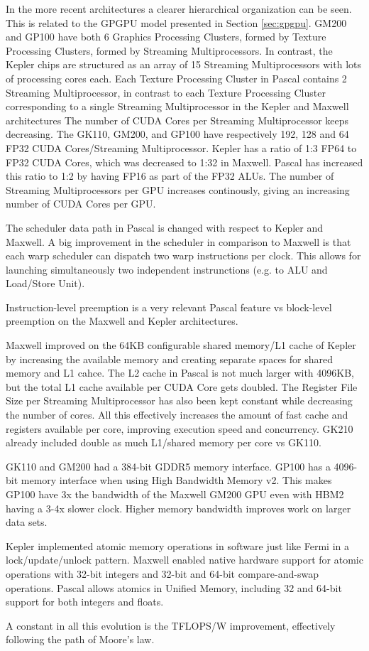 In the more recent architectures a clearer hierarchical organization can be seen.
This is related to the GPGPU model presented in Section \ref{sec:gpgpu}.
GM200 and GP100 have both 6 Graphics Processing Clusters, formed by Texture Processing Clusters, formed by Streaming Multiprocessors.
In contrast, the Kepler chips are structured as an array of 15 Streaming Multiprocessors with lots of processing cores each.
Each Texture Processing Cluster in Pascal contains 2 Streaming Multiprocessor, in contrast to each Texture Processing Cluster corresponding to a single Streaming Multiprocessor in the Kepler and Maxwell architectures
The number of CUDA Cores per Streaming Multiprocessor keeps decreasing.
The GK110, GM200, and GP100 have respectively 192, 128 and 64 FP32 CUDA Cores/Streaming Multiprocessor.
Kepler has a ratio of 1:3 FP64 to FP32 CUDA Cores, which was decreased to 1:32 in Maxwell.
Pascal has increased this ratio to 1:2 by having FP16 as part of the FP32 ALUs.
The number of Streaming Multiprocessors per GPU increases continously, giving an increasing number of CUDA Cores per GPU.

The scheduler data path in Pascal is changed with respect to Kepler and Maxwell.
A big improvement in the scheduler in comparison to Maxwell is that each warp scheduler can dispatch two warp instructions per clock.
This allows for launching simultaneously two independent instrunctions (e.g. to ALU and Load/Store Unit).

Instruction-level preemption is a very relevant Pascal feature vs block-level preemption on the Maxwell and Kepler architectures.

Maxwell improved on the 64KB configurable shared memory/L1 cache of Kepler by increasing the available memory and creating separate spaces for shared memory and L1 cahce.
The L2 cache in Pascal is not much larger with 4096KB, but the total L1 cache available per CUDA Core gets doubled.
The Register File Size per Streaming Multiprocessor has also been kept constant while decreasing the number of cores.
All this effectively increases the amount of fast cache and registers available per core, improving execution speed and concurrency.
GK210 already included double as much L1/shared memory per core vs GK110.

GK110 and GM200 had a 384-bit GDDR5 memory interface.
GP100 has a 4096-bit memory interface when using High Bandwidth Memory v2.
This makes GP100 have 3x the bandwidth of the Maxwell GM200 GPU even with HBM2 having a 3-4x slower clock.
Higher memory bandwidth improves work on larger data sets.

Kepler implemented atomic memory operations in software just like Fermi in a lock/update/unlock pattern.
Maxwell enabled native hardware support for atomic operations with 32-bit integers and 32-bit and 64-bit compare-and-swap operations.
Pascal allows atomics in Unified Memory, including 32 and 64-bit support for both integers and floats.

A constant in all this evolution is the TFLOPS/W improvement, effectively following the path of Moore's law.
